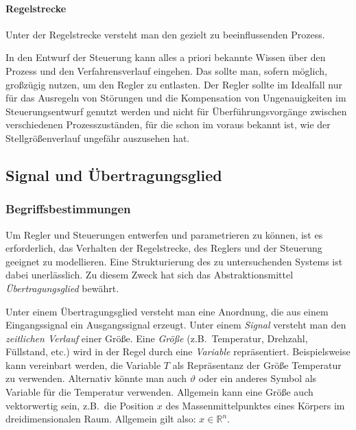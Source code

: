 \paragraph{Regelstrecke} Unter der Regelstrecke versteht man den gezielt zu beeinflussenden Prozess.
\begin{RstWichtigBox}
  In den Entwurf der Steuerung kann alles a priori bekannte Wissen über den Prozess und den Verfahrensverlauf eingehen. Das sollte man, sofern möglich, großzügig nutzen, um den Regler zu entlasten. Der Regler sollte im Idealfall nur für das Ausregeln von Störungen und die Kompensation von Ungenauigkeiten im Steuerungsentwurf genutzt werden und nicht für Überführungsvorgänge zwischen verschiedenen Prozesszuständen, für die schon im voraus bekannt ist, wie der Stellgrößenverlauf ungefähr auszusehen hat.
\end{RstWichtigBox}

\subsection{Signal und Übertragungsglied}\label{sec:gro3e-signal-und}
\subsubsection{Begriffsbestimmungen}\label{sec:begriffsbestimmungen}
Um Regler und Steuerungen entwerfen und parametrieren zu können, ist es erforderlich, das Verhalten der Regelstrecke, des Reglers und der Steuerung geeignet zu modellieren. Eine Strukturierung des zu untersuchenden Systems ist dabei unerlässlich. Zu diesem Zweck hat sich das Abstraktionsmittel \emph{Übertragungsglied} bewährt.

Unter einem Übertragungsglied versteht man eine Anordnung, die aus einem Eingangssignal ein Ausgangssignal erzeugt.
Unter einem \emph{Signal} versteht man den \emph{zeitlichen Verlauf} einer Größe. Eine \emph{Größe} (z.B.~Temperatur, Drehzahl, Füllstand, etc.) wird in der Regel durch eine \emph{Variable} repräsentiert.
Beispielsweise kann vereinbart werden, die Variable $T$ als Repräsentanz der Größe Temperatur zu verwenden. Alternativ könnte man auch $\vartheta$ oder ein anderes Symbol als Variable für die Temperatur verwenden. Allgemein kann eine Größe auch vektorwertig sein, z.B.~die Position $x$ des Massenmittelpunktes eines Körpers im dreidimensionalen Raum. Allgemein gilt also: $x \in \mathbb{R}^n$.

